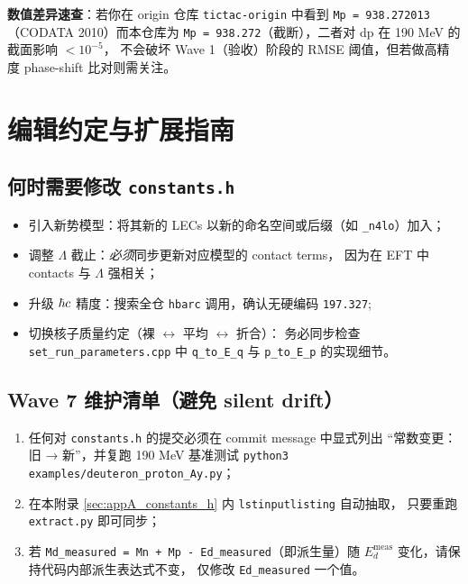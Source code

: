 \noindent
\textbf{数值差异速查}：若你在 origin 仓库 \texttt{tictac-origin} 中看到
\texttt{Mp = 938.272013}（CODATA 2010）而本仓库为
\texttt{Mp = 938.272}（截断），二者对 dp 在 190 \si{MeV} 的截面影响 $< 10^{-5}$，
不会破坏 Wave 1（验收）阶段的 RMSE 阈值，但若做高精度 phase-shift 比对则需关注。

\section{编辑约定与扩展指南}
\label{sec:appA_editing}

\subsection{何时需要修改 \texttt{constants.h}}

\begin{itemize}
\item 引入新势模型：将其新的 LECs 以新的命名空间或后缀（如 \texttt{\_n4lo}）加入；
\item 调整 $\Lambda$ 截止：\emph{必须}同步更新对应模型的 contact terms，
      因为在 EFT 中 contacts 与 $\Lambda$ 强相关；
\item 升级 $\hbar c$ 精度：搜索全仓 \texttt{hbarc} 调用，确认无硬编码 \texttt{197.327};
\item 切换核子质量约定（裸 $\leftrightarrow$ 平均 $\leftrightarrow$ 折合）：
      务必同步检查 \texttt{set\_run\_parameters.cpp} 中
      \texttt{q\_to\_E\_q} 与 \texttt{p\_to\_E\_p} 的实现细节。
\end{itemize}

\subsection{Wave 7 维护清单（避免 silent drift）}

\begin{enumerate}
\item 任何对 \texttt{constants.h} 的提交必须在 commit message 中显式列出
      “常数变更：旧 → 新”，并复跑 190 \si{MeV} 基准测试
      \texttt{python3 examples/deuteron\_proton\_Ay.py}；
\item 在本附录 \cref{sec:appA_constants_h} 内 \texttt{lstinputlisting} 自动抽取，
      只要重跑 \texttt{extract.py} 即可同步；
\item 若 \texttt{Md\_measured = Mn + Mp - Ed\_measured}（即派生量）随
      $E_d^{\text{meas}}$ 变化，请保持代码内部派生表达式不变，
      仅修改 \texttt{Ed\_measured} 一个值。
\end{enumerate}

